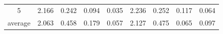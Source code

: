 \begin{table}[h!]
\begin{tabular}{|c|r|r|r|r|r|r|r|r|}
5                                                                           & 2.166                            & 0.242                            & 0.094                              & 0.035                               & 2.236                            & 0.252                            & 0.117                              & 0.064                               \\
average                                                                     & 2.063                            & 0.458                            & 0.179                              & 0.057                               & 2.127                            & 0.475                            & 0.065                              & 0.097                              
\end{tabular}
\end{table}
